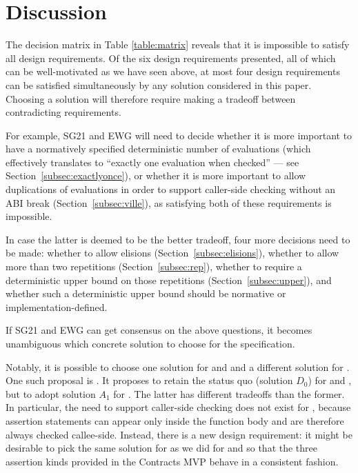 
\section{Discussion}

The decision matrix in Table \ref{table:matrix} reveals that it is impossible to satisfy all design requirements. Of the six design requirements presented, all of which can be well-motivated as we have seen above, at most four design requirements can be satisfied simultaneously by any solution considered in this paper. Choosing a solution will therefore require making a tradeoff between contradicting requirements.

For example, SG21 and EWG will need to decide  whether it is more important to have a normatively specified deterministic number of evaluations (which effectively translates to ``exactly one evaluation when checked'' --- see Section~\ref{subsec:exactlyonce}), or whether it is more important to allow duplications of evaluations in order to support caller-side checking without an ABI break (Section~\ref{subsec:ville}), as satisfying both of these requirements is impossible.

In case the latter is deemed to be the better tradeoff, four more decisions need to be made: whether to allow elisions (Section~\ref{subsec:elisions}), whether to allow more than two repetitions (Section~\ref{subsec:rep}), whether to require a deterministic upper bound on those repetitions (Section~\ref{subsec:upper}), and whether such a deterministic upper bound should be normative or implementation-defined.

If SG21 and EWG can get consensus on the above questions, it becomes unambiguous which concrete solution to choose for the specification.

Notably, it is possible to choose one solution for  and  and a different solution for \mbox{}. One such proposal is \cite{P3257R0}. It proposes to retain the status quo (solution $D_0$) for  and , but to adopt solution $A_1$ for . The latter has different tradeoffs than the former. In particular, the need to support caller-side checking does not exist for , because assertion statements can appear only inside the function body and are therefore always checked callee-side. Instead, there is a new design requirement: it might be desirable to pick the same solution for  as we did for  and  so that the three assertion kinds provided in the Contracts MVP behave in a consistent fashion.

